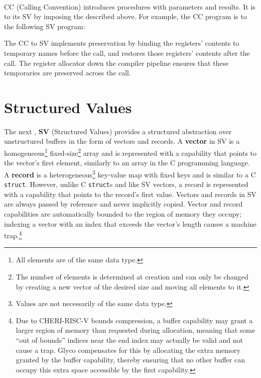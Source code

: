 \documentclass[main.tex]{subfiles}
\begin{document}
\hspace{0pt} \\
CC (Calling Convention) introduces procedures with parameters and results. It is \lowered{} to its  SV by imposing the  described above. For example, the CC program
is \lowered{} to the following SV program:

The CC to SV  implements  preservation by binding the registers' contents to temporary names before the call, and restores those registers' contents after the call. The register allocator down the compiler pipeline ensures that these temporaries are preserved across the call. %

\section{Structured Values} \label{sct:sv}
The next , \textbf{SV} (Structured Values) provides a structured abstraction over unstructured buffers in the form of vectors and records. A \textbf{vector} in SV is a homogeneous\footnote{All elements are of the same data type.} fixed-size\footnote{The number of elements is determined at creation and can only be changed by creating a new vector of the desired size and moving all elements to it.} array and is represented with a capability that points to the vector's first element, similarly to an array in the C programming language. A \textbf{record} is a heterogeneous\footnote{Values are not necessarily of the same data type.} key-value map with fixed keys and is similar to a C \texttt{struct}. However, unlike C \texttt{struct}s and like SV vectors, a record is represented with a capability that points to the record's first value. Vectors and records in SV are always passed by reference and never implicitly copied. Vector and record capabilities are automatically bounded to the region of memory they occupy; indexing a vector with an index that exceeds the vector's length causes a machine trap.\footnote{Due to CHERI-RISC-V bounds compression, a buffer capability may grant a larger region of memory than requested during allocation, meaning that some \enquote{out of bounds} indices near the end index may actually be valid and not cause a trap. Glyco compensates for this by allocating the extra memory granted by the buffer capability, thereby ensuring that no other buffer can occupy this extra space accessible by the first capability.}
\end{document}
